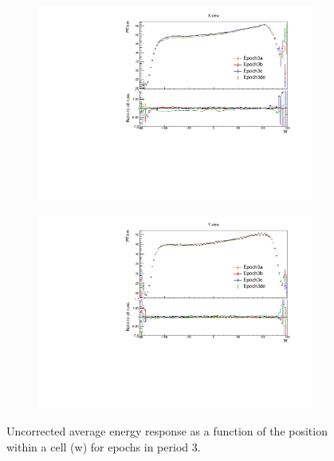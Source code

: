 \documentclass[12pt,a4paper]{article}
\begin{document}
\begin{figure}[!hbtp]
\centering
\begin{subfigure}[b]{0.495\textwidth}
\centering
\includegraphics[width=\textwidth]{Plots/Attenprofs_P3Data_WPE_corr_xy_X_Combined.pdf}
\end{subfigure}
\begin{subfigure}[b]{0.495\textwidth}
\centering
\includegraphics[width=\textwidth]{Plots/Attenprofs_P3Data_WPE_corr_xy_Y_Combined.pdf}
\end{subfigure}
\caption{Uncorrected average energy response as a function of the position within a cell (w) for epochs in period 3.}
\label{figCalibhistWPE_period3}
\end{figure}
\end{document}
